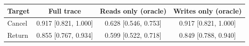 \begin{tabular}{lccc}
\toprule
Target & Full trace & Reads only (oracle) & Writes only (oracle) \\
\midrule
Cancel & 0.917 [0.821, 1.000] & 0.628 [0.546, 0.753] & 0.917 [0.821, 1.000] \\
Return & 0.855 [0.767, 0.934] & 0.599 [0.522, 0.718] & 0.849 [0.788, 0.940] \\
\bottomrule
\end{tabular}
